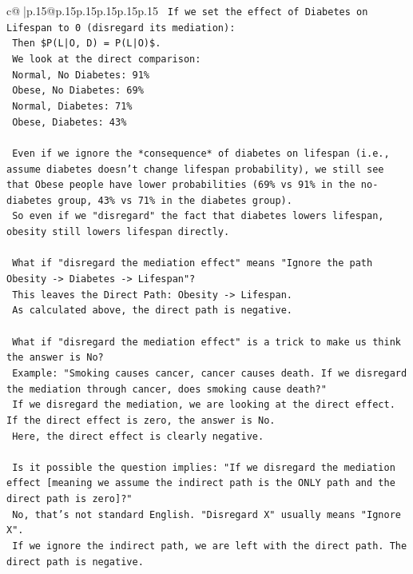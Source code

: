 \documentclass{article}
\begin{document}
{\begin{supertabular}{c@{$\;$}|p{.15\linewidth}@{}p{.15\linewidth}p{.15\linewidth}p{.15\linewidth}p{.15\linewidth}p{.15\linewidth}}
{{{\texttt{    If we set the effect of Diabetes on Lifespan to 0 (disregard its mediation):} \\
\texttt{    Then \$P(L|O, D) = P(L|O)\$.} \\
\texttt{    We look at the direct comparison:} \\
\texttt{    Normal, No Diabetes: 91\%} \\
\texttt{    Obese, No Diabetes: 69\%} \\
\texttt{    Normal, Diabetes: 71\%} \\
\texttt{    Obese, Diabetes: 43\%} \\
\\ 
\texttt{    Even if we ignore the *consequence* of diabetes on lifespan (i.e., assume diabetes doesn't change lifespan probability), we still see that Obese people have lower probabilities (69\% vs 91\% in the no{-}diabetes group, 43\% vs 71\% in the diabetes group).} \\
\texttt{    So even if we "disregard" the fact that diabetes lowers lifespan, obesity still lowers lifespan directly.} \\
\\ 
\texttt{    What if "disregard the mediation effect" means "Ignore the path Obesity {-}> Diabetes {-}> Lifespan"?} \\
\texttt{    This leaves the Direct Path: Obesity {-}> Lifespan.} \\
\texttt{    As calculated above, the direct path is negative.} \\
\\ 
\texttt{    What if "disregard the mediation effect" is a trick to make us think the answer is No?} \\
\texttt{    Example: "Smoking causes cancer, cancer causes death. If we disregard the mediation through cancer, does smoking cause death?"} \\
\texttt{    If we disregard the mediation, we are looking at the direct effect. If the direct effect is zero, the answer is No.} \\
\texttt{    Here, the direct effect is clearly negative.} \\
\\ 
\texttt{    Is it possible the question implies: "If we disregard the mediation effect {[}meaning we assume the indirect path is the ONLY path and the direct path is zero{]}?"} \\
\texttt{    No, that's not standard English. "Disregard X" usually means "Ignore X".} \\
\texttt{    If we ignore the indirect path, we are left with the direct path. The direct path is negative.} \\
}}}
\end{supertabular}}
\end{document}
